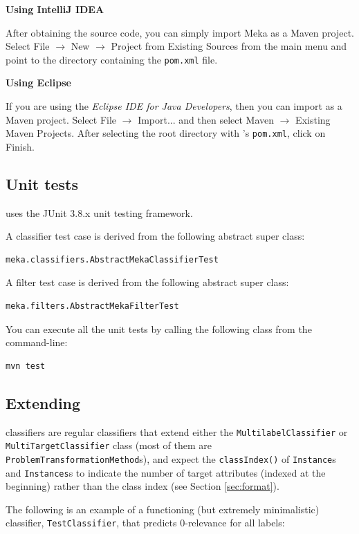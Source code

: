 \documentclass[11pt]{article}
\newcommand{\MEKA}{Meka}
\newcommand{\WEKA}{Weka}
\newcommand{\heading}[1]{
    \vspace{0.3cm} \noindent \textbf{#1} \newline
}
\begin{document}
\heading{Using IntelliJ IDEA}
After obtaining the source code, you can simply import Meka as a Maven project.
Select \textsf{File $\rightarrow$ New $\rightarrow$ Project from Existing Sources} from the main menu and point to
the directory containing the \texttt{pom.xml} file.

\heading{Using Eclipse}
If you are using the \textit{Eclipse IDE for Java Developers}, then you can import as a Maven project.
Select \textsf{File $\rightarrow$ Import...} and then select {Maven $\rightarrow$ Existing Maven Projects}.
After selecting the root directory with \framework{\MEKA}'s \texttt{pom.xml}, click on \textsf{Finish}.

\subsection{Unit tests}
\label{unittests}
\framework{\MEKA} uses the JUnit 3.8.x unit testing framework.

\noindent A classifier test case is derived from the following abstract super class:
\begin{lstlisting}
meka.classifiers.AbstractMekaClassifierTest
\end{lstlisting}

\noindent A filter test case is derived from the following abstract super class:
\begin{lstlisting}
meka.filters.AbstractMekaFilterTest
\end{lstlisting}

\noindent You can execute all the unit tests by calling the following class from the command-line:
\begin{lstlisting}
mvn test
\end{lstlisting}

\subsection{\label{sec:extending}Extending \framework{\MEKA}}%

\framework{\MEKA} classifiers are regular \framework{\WEKA} classifiers that extend either the \texttt{MultilabelClassifier} or \texttt{MultiTargetClassifier} class (most of them are \texttt{ProblemTransformationMethod}s), and expect the \texttt{classIndex()} of \texttt{Instance}s and \texttt{Instances}s to indicate the number of target attributes (indexed at the beginning) rather than the class index (see Section \ref{sec:format}). 

The following is an example of a functioning (but extremely minimalistic) classifier, \texttt{TestClassifier}, that predicts $0$-relevance for all labels:
\end{document}
